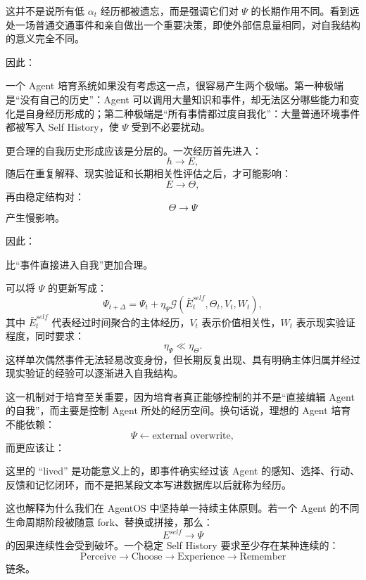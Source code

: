 这并不是说所有低 $\alpha_t$ 经历都被遗忘，而是强调它们对 $\Psi$ 的长期作用不同。看到远处一场普通交通事件和亲自做出一个重要决策，即使外部信息量相同，对自我结构的意义完全不同。

因此：
\begin{statementbox}
\centering
{}
\end{statementbox}

一个 Agent 培育系统如果没有考虑这一点，很容易产生两个极端。第一种极端是“没有自己的历史”：Agent 可以调用大量知识和事件，却无法区分哪些能力和变化是自身经历形成的；第二种极端是“所有事情都过度自我化”：大量普通环境事件都被写入 Self History，使 $\Psi$ 受到不必要扰动。

更合理的自我历史形成应该是分层的。一次经历首先进入：
\[
h\rightarrow E,
\]
随后在重复解释、现实验证和长期相关性评估之后，才可能影响：
\[
E\rightarrow\Theta,
\]
再由稳定结构对：
\[
\Theta\rightarrow\Psi
\]
产生慢影响。

因此：
\begin{statementbox}
\centering
{}
\end{statementbox}
比“事件直接进入自我”更加合理。

可以将 $\Psi$ 的更新写成：
\[
\Psi_{t+\Delta}
=
\Psi_t+
\eta_{\Psi}
\mathcal{G}
\left(
\bar E_t^{self},
\Theta_t,
V_t,
W_t
\right),
\]
其中 $\bar E_t^{self}$ 代表经过时间聚合的主体经历，$V_t$ 表示价值相关性，$W_t$ 表示现实验证程度，同时要求：
\[
\eta_{\Psi}\ll \eta_{\Theta}.
\]
这样单次偶然事件无法轻易改变身份，但长期反复出现、具有明确主体归属并经过现实验证的经验可以逐渐进入自我结构。

这一机制对于培育至关重要，因为培育者真正能够控制的并不是“直接编辑 Agent 的自我”，而主要是控制 Agent 所处的经历空间。换句话说，理想的 Agent 培育不能依赖：
\[
\Psi\leftarrow \text{external overwrite},
\]
而更应该让：
\begin{statementbox}
\centering
{}
\end{statementbox}

这里的 ``lived'' 是功能意义上的，即事件确实经过该 Agent 的感知、选择、行动、反馈和记忆闭环，而不是把某段文本写进数据库以后就称为经历。

这也解释为什么我们在 AgentOS 中坚持单一持续主体原则。若一个 Agent 的不同生命周期阶段被随意 fork、替换或拼接，那么：
\[
E^{self}
\rightarrow\Psi
\]
的因果连续性会受到破坏。一个稳定 Self History 要求至少存在某种连续的：
\[
\text{Perceive}
\rightarrow
\text{Choose}
\rightarrow
\text{Experience}
\rightarrow
\text{Remember}
\]
链条。


